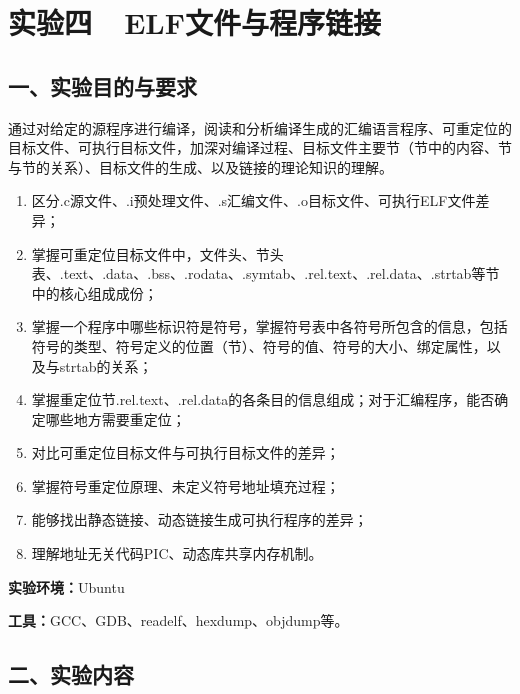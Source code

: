 \documentclass[12pt,a4paper]{ctexart}
\begin{document}
\newpage

\section*{实验四\ \ ELF文件与程序链接}

\subsection*{一、实验目的与要求}

通过对给定的源程序进行编译，阅读和分析编译生成的汇编语言程序、可重定位的目标文件、可执行目标文件，加深对编译过程、目标文件主要节（节中的内容、节与节的关系）、目标文件的生成、以及链接的理论知识的理解。

\begin{enumerate}[label=（\arabic*）,nosep,leftmargin=*]
    \item 区分.c源文件、.i预处理文件、.s汇编文件、.o目标文件、可执行ELF文件差异；
    \item 掌握可重定位目标文件中，文件头、节头表、.text、.data、.bss、.rodata、.symtab、.rel.text、.rel.data、.strtab等节中的核心组成成份；
    \item 掌握一个程序中哪些标识符是符号，掌握符号表中各符号所包含的信息，包括符号的类型、符号定义的位置（节）、符号的值、符号的大小、绑定属性，以及与strtab的关系；
    \item 掌握重定位节.rel.text、.rel.data的各条目的信息组成；对于汇编程序，能否确定哪些地方需要重定位；
    \item 对比可重定位目标文件与可执行目标文件的差异；
    \item 掌握符号重定位原理、未定义符号地址填充过程；
    \item 能够找出静态链接、动态链接生成可执行程序的差异；
    \item 理解地址无关代码PIC、动态库共享内存机制。
\end{enumerate}

\vspace{0.3cm}
\textbf{实验环境：}Ubuntu

\textbf{工具：}GCC、GDB、readelf、hexdump、objdump等。

\subsection*{二、实验内容}
\end{document}

